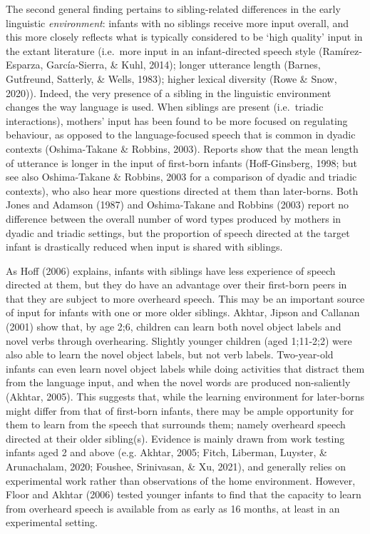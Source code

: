 \documentclass[
  man,mask,floatsintext]{apa6}
\begin{document}
The second general finding pertains to sibling-related differences in the early linguistic \emph{environment}: infants with no siblings receive more input overall, and this more closely reflects what is typically considered to be `high quality' input in the extant literature (i.e.~more input in an infant-directed speech style (Ramírez-Esparza, García-Sierra, \& Kuhl, 2014); longer utterance length (Barnes, Gutfreund, Satterly, \& Wells, 1983); higher lexical diversity (Rowe \& Snow, 2020)). Indeed, the very presence of a sibling in the linguistic environment changes the way language is used. When siblings are present (i.e.~triadic interactions), mothers' input has been found to be more focused on regulating behaviour, as opposed to the language-focused speech that is common in dyadic contexts (Oshima-Takane \& Robbins, 2003). Reports show that the mean length of utterance is longer in the input of first-born infants (Hoff-Ginsberg, 1998; but see also Oshima-Takane \& Robbins, 2003 for a comparison of dyadic and triadic contexts), who also hear more questions directed at them than later-borns. Both Jones and Adamson (1987) and Oshima-Takane and Robbins (2003) report no difference between the overall number of word types produced by mothers in dyadic and triadic settings, but the proportion of speech directed at the target infant is drastically reduced when input is shared with siblings.

As Hoff (2006) explains, infants with siblings have less experience of speech directed at them, but they do have an advantage over their first-born peers in that they are subject to more overheard speech. This may be an important source of input for infants with one or more older siblings. Akhtar, Jipson and Callanan (2001) show that, by age 2;6, children can learn both novel object labels and novel verbs through overhearing. Slightly younger children (aged 1;11-2;2) were also able to learn the novel object labels, but not verb labels. Two-year-old infants can even learn novel object labels while doing activities that distract them from the language input, and when the novel words are produced non-saliently (Akhtar, 2005). This suggests that, while the learning environment for later-borns might differ from that of first-born infants, there may be ample opportunity for them to learn from the speech that surrounds them; namely overheard speech directed at their older sibling(s). Evidence is mainly drawn from work testing infants aged 2 and above (e.g. Akhtar, 2005; Fitch, Liberman, Luyster, \& Arunachalam, 2020; Foushee, Srinivasan, \& Xu, 2021), and generally relies on experimental work rather than observations of the home environment. However, Floor and Akhtar (2006) tested younger infants to find that the capacity to learn from overheard speech is available from as early as 16 months, at least in an experimental setting.
\end{document}
